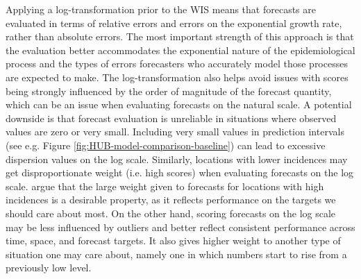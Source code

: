 \documentclass{article}
\begin{document}
Applying a log-transformation prior to the WIS means that forecasts are evaluated in terms of relative errors and errors on the exponential growth rate, rather than absolute errors. The most important strength of this approach is that the evaluation better accommodates the exponential nature of the epidemiological process and the types of errors forecasters who accurately model those processes are expected to make. The log-transformation also helps avoid issues with scores being strongly influenced by the order of magnitude of the forecast quantity, which can be an issue when evaluating forecasts on the natural scale. 
A potential downside is that forecast evaluation is unreliable in situations where observed values are zero or very small. Including very small values in prediction intervals (see e.g. Figure \ref{fig:HUB-model-comparison-baseline}) can lead to excessive dispersion values on the log scale. 
Similarly, locations with lower incidences may get disproportionate weight (i.e. high scores) when evaluating forecasts on the log scale. \cite{bracherEvaluatingEpidemicForecasts2021} argue that the large weight given to forecasts for locations with high incidences is a desirable property, as it reflects performance on the targets we should care about most. On the other hand, scoring forecasts on the log scale may be less influenced by outliers and better reflect consistent performance across time, space, and forecast targets. It also gives higher weight to another type of situation one may care about, namely one in which numbers start to rise from a previously low level. 
\end{document}
